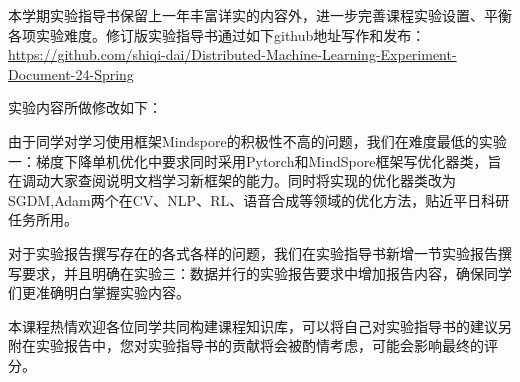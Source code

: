 

\hspace{2em} 本学期实验指导书保留上一年丰富详实的内容外，进一步完善课程实验设置、平衡各项实验难度。修订版实验指导书通过如下github地址写作和发布：\url{https://github.com/shiqi-dai/Distributed-Machine-Learning-Experiment-Document-24-Spring}

\hspace{2em} 实验内容所做修改如下：

\hspace{2em} 由于同学对学习使用框架Mindspore的积极性不高的问题，我们在难度最低的实验一：梯度下降单机优化中要求同时采用Pytorch和MindSpore框架写优化器类，旨在调动大家查阅说明文档学习新框架的能力。同时将实现的优化器类改为SGDM,Adam两个在CV、NLP、RL、语音合成等领域的优化方法，贴近平日科研任务所用。

\hspace{2em} 对于实验报告撰写存在的各式各样的问题，我们在实验指导书新增一节实验报告撰写要求，并且明确在实验三：数据并行的实验报告要求中增加报告内容，确保同学们更准确明白掌握实验内容。

\hspace{2em} 本课程热情欢迎各位同学共同构建课程知识库，可以将自己对实验指导书的建议另附在实验报告中，您对实验指导书的贡献将会被酌情考虑，可能会影响最终的评分。

\vspace{5em}



